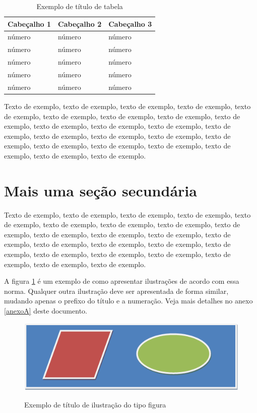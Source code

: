 \documentclass[
	12pt,				%
	oneside,			%
	a4paper,			%
	english,			%
	brazil				%
	]{abntex2ppgsi}
\begin{document}
\begin{table}[htbp]
	\centering
	\caption{Exemplo de título de tabela}
		\begin{tabular}{p{1.0in} p{1.0in} p{1.0in} } \hline
		
		Cabeçalho 1	& Cabeçalho 2	& Cabeçalho 3	 \\ \hline
		número & número	& número \\ 
		número & número	& número \\ 
		número & número	& número \\ 
		número & número	& número \\ 
		número & número	& número \\ \hline
			
		\end{tabular}
	\label{tab:ExemploDeTabela5}
\end{table}


Texto de exemplo, texto de exemplo, texto de exemplo, texto de exemplo, texto de exemplo, texto de exemplo, texto de exemplo, texto de exemplo, texto de exemplo, texto de exemplo, texto de exemplo, texto de exemplo, texto de exemplo, texto de exemplo, texto de exemplo, texto de exemplo, texto de exemplo, texto de exemplo, texto de exemplo, texto de exemplo, texto de exemplo, texto de exemplo, texto de exemplo.

\section{Mais uma seção secundária}

Texto de exemplo, texto de exemplo, texto de exemplo, texto de exemplo, texto de exemplo, texto de exemplo, texto de exemplo, texto de exemplo, texto de exemplo, texto de exemplo, texto de exemplo, texto de exemplo, texto de exemplo, texto de exemplo, texto de exemplo, texto de exemplo, texto de exemplo, texto de exemplo, texto de exemplo, texto de exemplo, texto de exemplo, texto de exemplo, texto de exemplo.

A figura \ref{fig:figura-exemplo5} é um exemplo de como apresentar ilustrações de acordo com essa norma. Qualquer outra ilustração deve ser apresentada de forma similar, mudando apenas o prefixo do título e a numeração. Veja mais detalhes no anexo \ref{anexoA} deste documento.

\begin{figure}[htbp]
	\centering
	\caption{Exemplo de título de ilustração do tipo figura}
		\includegraphics{figuras/figura-exemplo.png}
	\label{fig:figura-exemplo5}
\end{figure}
\end{document}

